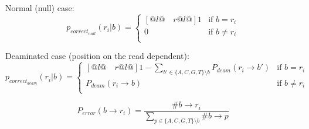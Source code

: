 \documentclass[a4paper,12pt]{article}
\begin{document}
\noindent  Normal (null) case:
\begin{equation}
  p_{correct_{null}}(r_i|b)   = \begin{cases}[@{}l@{\quad}r@{}l@{}]
    1  &  \text{if }  b = r_i    \\
    0 &  \text{if }  b \ne r_i    \\
  \end{cases}
\end{equation} 

\noindent  Deaminated case (position on the read dependent):
\begin{equation}
  p_{correct_{deam}}(r_i|b)   = \begin{cases}[@{}l@{\quad}r@{}l@{}]
    1-\sum\limits_{b' \in \{ A,C,G,T \} \setminus b}   P_{deam}(r_i \to b')  &  \text{if }  b = r_i    \\
    P_{deam}(r_i \to b) &  \text{if }  b \ne r_i    \\
  \end{cases}
\end{equation} 


\begin{equation}
  P_{error}(  b \to r_i )  = \frac { \# b \to r_i } { \sum\limits_{p \in \{ A,C,G,T \} \setminus b } \# b \to p }
\end{equation}

\end{document}

